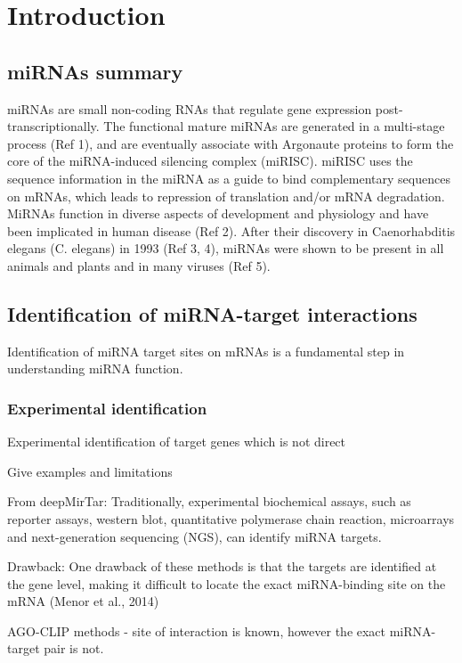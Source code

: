 \documentclass{bmcart}
\begin{document}
\section*{Introduction}


\subsection*{miRNAs summary}
miRNAs are small non-coding RNAs that regulate gene expression post-transcriptionally. The functional mature miRNAs are generated in a multi-stage process (Ref 1), and are eventually associate with Argonaute proteins to form the core of the miRNA-induced silencing complex (miRISC). miRISC uses the sequence information in the miRNA as a guide to bind complementary sequences on mRNAs, which leads to repression of translation and/or mRNA degradation. MiRNAs function in diverse aspects of development and physiology and have been implicated in human disease (Ref 2). After their discovery in Caenorhabditis elegans (C. elegans) in 1993 (Ref 3, 4), miRNAs were shown to be present in all animals and plants and in many viruses (Ref 5).

\subsection*{Identification of miRNA-target interactions}
Identification of miRNA target sites on mRNAs is a fundamental step in understanding miRNA function.

\subsubsection*{Experimental identification}

Experimental identification of target genes which is not direct

Give examples and limitations

From deepMirTar:
Traditionally, experimental biochemical assays, such as reporter assays, western blot, quantitative polymerase chain reaction, microarrays and next-generation sequencing (NGS), can identify miRNA targets.

Drawback:
One drawback of these methods is that the targets are identified at the gene level, making it difficult to locate the exact miRNA-binding site on the mRNA (Menor et al., 2014)

AGO-CLIP methods - site of interaction is known, however the exact miRNA-target pair is not.

\end{document}
